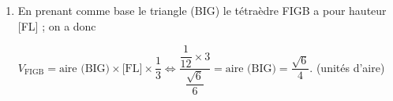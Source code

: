\begin{enumerate}
\begin{enumerate}
on a FL$^2 = \left\|\vect{\text{FL}}\right\|^2 = \left(-\dfrac13\right)^2 + \left(\dfrac16\right)^2  + \left(- \dfrac16 \right)^2  = \dfrac19 + \dfrac{1}{36} + \dfrac{1}{36} =  \dfrac{4}{36} + \dfrac{2}{36} = \dfrac{6}{36}$,

donc FL $ = \sqrt{\dfrac{6}{36}} = \dfrac{\sqrt{6}}{6}$.
		\item 
En prenant comme base le triangle (BIG) le tétraèdre FIGB a pour hauteur [FL] ; on a donc 
		
$V_{\text{FIGB}} = \text{aire (BIG)} \times \text{[FL]} \times \dfrac13 \iff \dfrac{\dfrac{1}{12} \times 3}{\dfrac{\sqrt{6}}{6}} = \text{aire (BIG)} = \dfrac{\sqrt{6}}{4}$. (unités d'aire)
	\end{enumerate}
\end{enumerate}

\medskip
